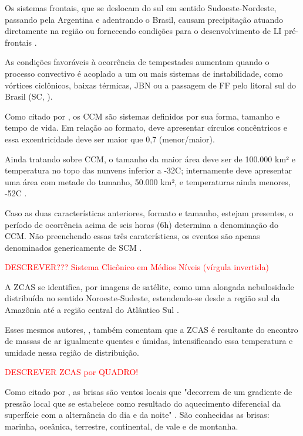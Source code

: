 \indent Os sistemas frontais, que se deslocam do sul em sentido Sudoeste-Nordeste, passando pela Argentina e adentrando o Brasil, causam precipitação atuando diretamente na região ou fornecendo condições para o desenvolvimento de \acrfull{LI} pré-frontais \cite{reboita2010}.

\indent As condições favoráveis à ocorrência de tempestades aumentam quando o processo convectivo é acoplado a um ou mais sistemas de instabilidade, como vórtices ciclônicos, baixas térmicas, \acrfull{JBN} ou a passagem de \acrlong{FF} pelo litoral sul do Brasil (\acrlong{SC}, \citeyear{AtlasSCnatureza}).

\indent Como citado por , os \acrfull{CCM} são sistemas definidos por sua forma, tamanho e tempo de vida. Em relação ao formato, deve apresentar círculos concêntricos e essa excentricidade deve ser maior que 0,7 (menor/maior).

\indent Ainda tratando sobre \acrshort{CCM}, o tamanho da maior área deve ser de 100.000 km² e temperatura no topo das nunvens inferior a -32C; internamente deve apresentar uma área com metade do tamanho, 50.000 km², e temperaturas ainda menores, -52C .

\indent  Caso as duas características anteriores, formato e tamanho, estejam presentes, o período de ocorrência acima de seis horas (6h) determina a denominação do \acrshort{CCM}. Não preenchendo essas três caraterísticas, os eventos são apenas denominados genericamente de \acrfull{SCM} .

\textcolor{red}{DESCREVER??? Sistema Clicônico em Médios Níveis (vírgula invertida)}

\indent A \acrfull{ZCAS} se identifica, por imagens de satélite, como uma alongada nebulosidade distribuída no sentido Noroeste-Sudeste, estendendo-se desde a região sul da Amazônia até a região central do Atlântico Sul \cite{ClimatologiaBasica}.

\indent Esses mesmos autores, , também comentam que a \acrshort{ZCAS} é resultante do encontro de massas de ar igualmente quentes e úmidas, intensificando essa temperatura e umidade nessa região de distribuição.

\textcolor{red}{DESCREVER ZCAS por QUADRO!}

\indent Como citado por , as brisas são ventos locais que "decorrem de um gradiente de pressão local que se estabelece como resultado do aquecimento diferencial da superfície com a alternância do dia e da noite" . São conhecidas as brisas: marinha, oceânica, terrestre, continental, de vale e de montanha.

